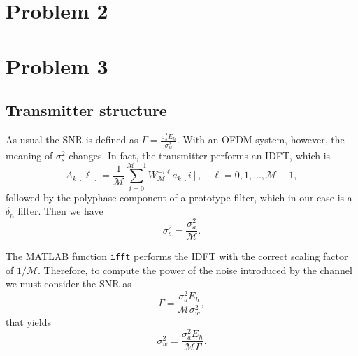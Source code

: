 \documentclass[10pt]{article}
\newcommand{\ofdM} {\mathcal{M}}
\begin{document}

\section*{Problem 2}

\section*{Problem 3}

\subsection*{Transmitter structure}


As usual the SNR is defined as $\Gamma = \frac{\sigma_s^2 E_h}{\sigma_w^2}$. With an OFDM system, however, the meaning of $\sigma_s^2$ changes. In fact, the transmitter performs an IDFT, which is
\begin{equation}
	A_k[\ell] = \frac{1}{\ofdM} \sum_{i = 0}^{\ofdM - 1} W_{\ofdM}^{-i\ell} a_k[i], \quad \ell = 0, 1, \dots, \ofdM-1,
\end{equation}
followed by the polyphase component of a prototype filter, which in our case is a $\delta_n$ filter. Then we have 
\begin{equation}
	\sigma_s^2 = \dfrac{\sigma_a^2}{\ofdM}.
\end{equation}

The MATLAB function \texttt{ifft} performs the IDFT with the correct scaling factor of $1/\ofdM$. Therefore, to compute the power of the noise introduced by the channel we must consider the SNR as
\begin{equation}
	\Gamma = \dfrac{\sigma_a^2 E_h}{\ofdM \sigma_w^2},
\end{equation}
that yields
\begin{equation}
	\sigma_w^2 = \dfrac{\sigma_a^2 E_h}{\ofdM \Gamma}.
\end{equation}
\end{document}
